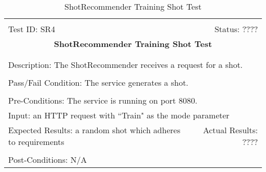 \documentclass[11pt]{article}
\begin{document}
\begin{center}
\begin{table}[H]
\begin{tabular}{|l r|}\hline&\\[-2mm]
	Test ID: SR4	&Status: ????\\[-3mm]
	\multicolumn{2}{|c|}{\textbf{\large{ShotRecommender Training Shot Test}}}\\&\\\hline&\\[-3mm]
	\multicolumn{2}{|p{\textwidth}|}{Description: The ShotRecommender receives a request for a shot.}\\[1mm]\hline&\\[-3mm]
	\multicolumn{2}{|p{\textwidth}|}{Pass/Fail Condition: The service generates a shot.}\\[1mm]\hline&\\[-3mm]
	\multicolumn{2}{|p{\textwidth}|}{Pre-Conditions: The service is running on port 8080.}\\[4mm]
	\multicolumn{2}{|p{\textwidth}|}{Input: an HTTP request with ``Train" as the mode parameter}\\[2mm]\hline
	\multicolumn{1}{|p{0.49\textwidth}}{Expected Results: a random shot which adheres to requirements}	&\multicolumn{1}{|p{0.45\textwidth}|}{Actual Results: ????}\\\hline&\\[-3mm]
	\multicolumn{2}{|p{\textwidth}|}{Post-Conditions: N/A}\\\hline
\end{tabular}
\caption{ShotRecommender Training Shot Test}
\end{table}
\end{center}
\end{document}
